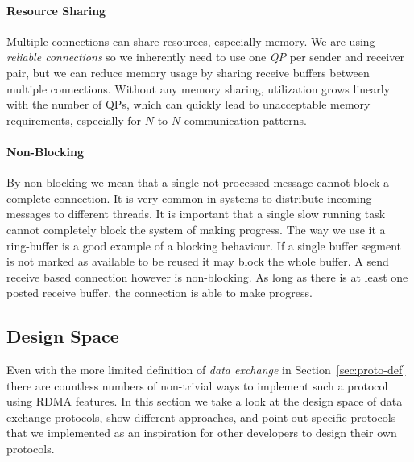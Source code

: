 \paragraph{Resource Sharing} Multiple connections can share resources, especially memory. We are using \emph{reliable connections}
so we inherently need to use one \emph{QP} per sender and receiver pair, but we can reduce memory usage by sharing receive 
buffers between multiple connections. Without any memory sharing, utilization grows linearly with the number of QPs, which 
can quickly lead to unacceptable memory requirements, especially for $N$ to $N$ communication patterns.

\paragraph{Non-Blocking} By non-blocking we mean that a single not processed message cannot block a complete connection. 
It is very common in systems to distribute incoming messages to different threads. It is important that a single slow running 
task cannot completely block the system of making progress. The way we use it a ring-buffer is a good example of a blocking
behaviour. If a single buffer segment is not marked as available to be reused it may block the whole buffer. A send receive 
based connection however is non-blocking. As long as there is at least one posted receive buffer, the connection is able to
make progress.




\subsection{Design Space} \label{sec:proto-ds}


Even with the more limited definition of \emph{data exchange} in Section~\ref{sec:proto-def} there are countless numbers
of non-trivial ways to implement such a protocol using RDMA features. In this section we take a look at the design 
space of data exchange protocols, show different approaches, and point out specific protocols that we implemented
as an inspiration for other developers to design their own protocols.


